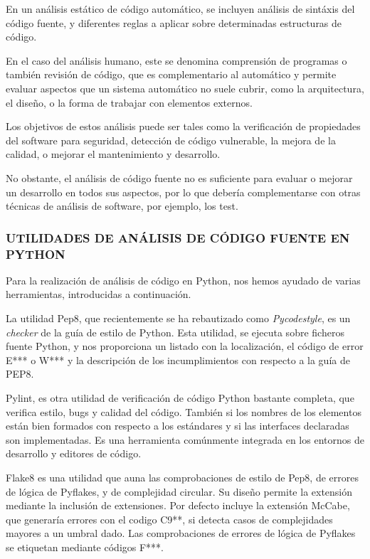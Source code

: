 En un análisis estático de código automático, se incluyen análisis de sintáxis del código fuente, y diferentes reglas a aplicar sobre determinadas estructuras de código.


En el caso del análisis humano, este se denomina comprensión de programas o también revisión de código, que es complementario al automático y permite evaluar aspectos que un sistema automático no suele cubrir, como la arquitectura, el diseño, o la forma de trabajar con elementos externos.


Los objetivos de estos análisis puede ser tales como la verificación de propiedades del software para seguridad, detección de código vulnerable, la mejora de la calidad, o mejorar el mantenimiento y desarrollo.


No obstante, el análisis de código fuente no es suficiente para evaluar o mejorar un desarrollo en todos sus aspectos, por lo que debería complementarse con otras técnicas de análisis de software, por ejemplo, los test.


\subsubsection{UTILIDADES DE ANÁLISIS DE CÓDIGO FUENTE EN PYTHON} 
\label{sec:utilidades_cod}


Para la realización de análisis de código en Python, nos hemos ayudado de varias herramientas, introducidas a continuación.


La utilidad Pep8, que recientemente se ha rebautizado como \textit{Pycodestyle}, es un \textit{checker} de la guía de estilo de Python. Esta utilidad, se ejecuta sobre ficheros fuente Python, y nos proporciona un listado con la localización, el código de error E*** o W*** y la descripción de los incumplimientos con respecto a la guía de PEP8.


Pylint, es otra utilidad de verificación de código Python bastante completa, que verifica estilo, bugs y calidad del código. También si los nombres de los elementos están bien formados con respecto a los estándares y si las interfaces declaradas son implementadas. Es una herramienta comúnmente integrada en los entornos de desarrollo y editores de código.


Flake8 es una utilidad que auna las comprobaciones de estilo de Pep8, de errores de lógica de Pyflakes, y de complejidad circular. Su diseño permite la extensión mediante la inclusión de extensiones. Por defecto incluye la extensión McCabe, que generaría errores con el codigo C9**, si detecta casos de complejidades mayores a un umbral dado. Las comprobaciones de errores de lógica de Pyflakes se etiquetan mediante códigos F***.


